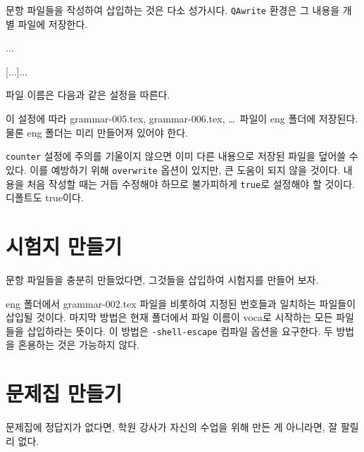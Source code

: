 \documentclass[a4paper]{oblivoir}
\begin{document}
문항 파일들을 작성하여 삽입하는 것은 다소 성가시다.
\texttt{QAwrite} 환경은 그 내용을 개별 파일에 저장한다.

\begin{boxedverbatim}
\begin{QAwrite}
\begin{premise}
... 
\end{premise}
[...]{...}
\end{QAwrite}
\end{boxedverbatim}

파일 이름은 다음과 같은 설정을 따른다.

\begin{boxedverbatim}
\end{boxedverbatim}

이 설정에 따라 grammar-005.tex, grammar-006.tex, \ldots\ 파일이 eng 폴더에 저장된다.
물론 eng 폴더는 미리 만들어져 있어야 한다.

\texttt{counter} 설정에 주의를 기울이지 않으면 이미 다른 내용으로 저장된 파일을 덮어쓸 수 있다.
이를 예방하기 위해 \texttt{overwrite} 옵션이 있지만, 큰 도움이 되지 않을 것이다.
내용을 처음 작성할 때는 거듭 수정해야 하므로 불가피하게 \texttt{true}로 설정해야 할 것이다.
디폴트도 true이다.

\section{시험지 만들기}

문항 파일들을 충분히 만들었다면, 그것들을 삽입하여 시험지를 만들어 보자.

\begin{boxedverbatim}
\end{boxedverbatim}

eng 폴더에서 grammar-002.tex 파일을 비롯하여 지정된 번호들과 일치하는 파일들이 삽입될 것이다.
마지막 방법은 현재 폴더에서 파일 이름이 voca로 시작하는 모든 파일들을 삽입하라는 뜻이다.
이 방법은 \texttt{-shell-escape} 컴파일 옵션을 요구한다.
두 방법을 혼용하는 것은 가능하지 않다.

\section{문제집 만들기}

문제집에 정답지가 없다면, 학원 강사가 자신의 수업을 위해 만든 게 아니라면, 잘 팔릴 리 없다.
\end{document}
